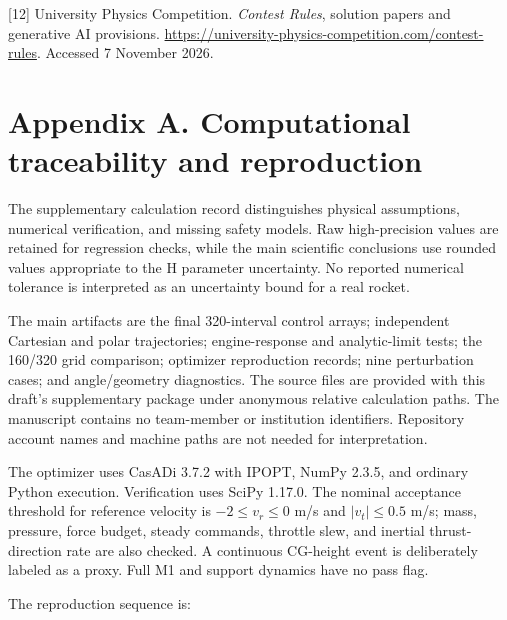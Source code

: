 \documentclass[
  11pt,
  a4paper,
]{article}
\begin{document}
{[}12{]} University Physics Competition. \emph{Contest Rules}, solution
papers and generative AI provisions.
\url{https://university-physics-competition.com/contest-rules}. Accessed
7 November 2026.

\section*{Appendix A. Computational traceability and
reproduction}\label{appendix-a.-computational-traceability-and-reproduction}

The supplementary calculation record distinguishes physical assumptions,
numerical verification, and missing safety models. Raw high-precision
values are retained for regression checks, while the main scientific
conclusions use rounded values appropriate to the H parameter
uncertainty. No reported numerical tolerance is interpreted as an
uncertainty bound for a real rocket.

The main artifacts are the final 320-interval control arrays;
independent Cartesian and polar trajectories; engine-response and
analytic-limit tests; the 160/320 grid comparison; optimizer
reproduction records; nine perturbation cases; and angle/geometry
diagnostics. The source files are provided with this draft's
supplementary package under anonymous relative calculation paths. The
manuscript contains no team-member or institution identifiers.
Repository account names and machine paths are not needed for
interpretation.

The optimizer uses CasADi 3.7.2 with IPOPT, NumPy 2.3.5, and ordinary
Python execution. Verification uses SciPy 1.17.0. The nominal acceptance
threshold for reference velocity is \(-2\le v_r\le0\) m/s and
\(|v_t|\le0.5\) m/s; mass, pressure, force budget, steady commands,
throttle slew, and inertial thrust-direction rate are also checked. A
continuous CG-height event is deliberately labeled as a proxy. Full M1
and support dynamics have no pass flag.

The reproduction sequence is:
\end{document}
